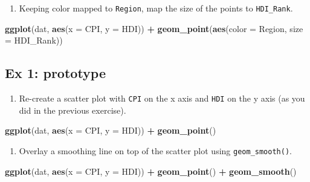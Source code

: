 \documentclass[
]{book}
\newenvironment{Shaded}{\begin{snugshade}}{\end{snugshade}}
\newcommand{\DataTypeTok}[1]{\textcolor[rgb]{0.13,0.29,0.53}{#1}}
\newcommand{\KeywordTok}[1]{\textcolor[rgb]{0.13,0.29,0.53}{\textbf{#1}}}
\newcommand{\NormalTok}[1]{#1}
\newcommand{\OperatorTok}[1]{\textcolor[rgb]{0.81,0.36,0.00}{\textbf{#1}}}
\newcommand{\StringTok}[1]{\textcolor[rgb]{0.31,0.60,0.02}{#1}}
\providecommand{\tightlist}{%
  \setlength{\itemsep}{0pt}\setlength{\parskip}{0pt}}
\begin{document}
\begin{enumerate}
\def\labelenumi{\arabic{enumi}.}
\setcounter{enumi}{4}
\tightlist
\item
  Keeping color mapped to \texttt{Region}, map the size of the points to \texttt{HDI\_Rank}.
\end{enumerate}

\begin{Shaded}
\begin{Highlighting}[]
\KeywordTok{ggplot}\NormalTok{(dat, }\KeywordTok{aes}\NormalTok{(}\DataTypeTok{x =}\NormalTok{ CPI, }\DataTypeTok{y =}\NormalTok{ HDI)) }\OperatorTok{+}
\KeywordTok{geom_point}\NormalTok{(}\KeywordTok{aes}\NormalTok{(}\DataTypeTok{color =}\NormalTok{ Region, }\DataTypeTok{size =}\NormalTok{  HDI_Rank))}
\end{Highlighting}
\end{Shaded}

\hypertarget{ex-1-prototype-2}{%
\subsection{Ex 1: prototype}\label{ex-1-prototype-2}}

\begin{enumerate}
\def\labelenumi{\arabic{enumi}.}
\tightlist
\item
  Re-create a scatter plot with \texttt{CPI} on the x axis and \texttt{HDI} on the y axis (as you did in the previous exercise).
\end{enumerate}

\begin{Shaded}
\begin{Highlighting}[]
\KeywordTok{ggplot}\NormalTok{(dat, }\KeywordTok{aes}\NormalTok{(}\DataTypeTok{x =}\NormalTok{ CPI, }\DataTypeTok{y =}\NormalTok{ HDI)) }\OperatorTok{+}
\StringTok{  }\KeywordTok{geom_point}\NormalTok{()}
\end{Highlighting}
\end{Shaded}

\begin{enumerate}
\def\labelenumi{\arabic{enumi}.}
\setcounter{enumi}{1}
\tightlist
\item
  Overlay a smoothing line on top of the scatter plot using \texttt{geom\_smooth()}.
\end{enumerate}

\begin{Shaded}
\begin{Highlighting}[]
\KeywordTok{ggplot}\NormalTok{(dat, }\KeywordTok{aes}\NormalTok{(}\DataTypeTok{x =}\NormalTok{ CPI, }\DataTypeTok{y =}\NormalTok{ HDI)) }\OperatorTok{+}
\StringTok{  }\KeywordTok{geom_point}\NormalTok{() }\OperatorTok{+}
\StringTok{  }\KeywordTok{geom_smooth}\NormalTok{()}
\end{Highlighting}
\end{Shaded}
\end{document}
